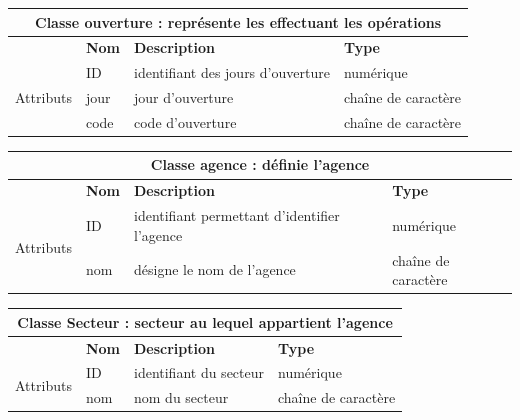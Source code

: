 		
		\begin{tabular}{|l|l|l|l|}
			\hline
			\multicolumn{4}{|c|}{\textbf{Classe ouverture : représente les effectuant les opérations}} \\
			
			\hline
			
			& \textbf{Nom} & \textbf{Description} & \textbf{Type} \\
			\multirow{3}{*}{Attributs} & ID & identifiant des jours d'ouverture & numérique \\
			
			& jour & jour d'ouverture & chaîne de caractère \\
			
			& code & code d'ouverture & chaîne de caractère \\
			\hline
			
		\end{tabular}
		\label{table10}
		
		
		\begin{tabular}{|l|l|l|l|}
			\hline
			\multicolumn{4}{|c|}{\textbf{Classe agence : définie l'agence}} \\
			
			\hline
			
			& \textbf{Nom} & \textbf{Description} & \textbf{Type} \\
			\multirow{3}{*}{Attributs} & ID & identifiant permettant d'identifier l'agence & numérique \\
			
			& nom & désigne le nom de l'agence& chaîne de caractère \\
			
			\hline
			
		\end{tabular}
		\label{table14}
		
		
		\begin{tabular}{|l|l|l|l|}
			\hline
			\multicolumn{4}{|c|}{\textbf{Classe Secteur : secteur au lequel appartient l'agence}} \\
			
			\hline
			
			& \textbf{Nom} & \textbf{Description} & \textbf{Type} \\
			\multirow{3}{*}{Attributs} & ID & identifiant du secteur & numérique \\
			
			& nom & nom du secteur &  chaîne de caractère \\
			
			\hline
			
		\end{tabular}
		\label{table11}
		
